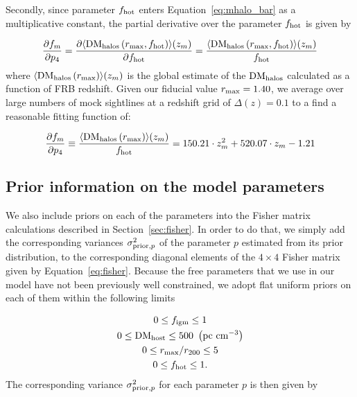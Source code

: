 \documentclass[twocolumn]{aastex63}
\newcommand{\fhot}{\ensuremath{f_\mathrm{hot}}}
\begin{document}
\begin{CJK*}{UTF8}{gbsn}
Secondly, since parameter $f_{\rm hot}$ enters Equation~\ref{eq:mhalo_bar} as a multiplicative constant, the partial derivative over the parameter $f_{\rm hot}$ is given by

\begin{equation}
    \frac{\partial f_m}{ \partial p_4} = \frac{ \partial \langle {\rm DM_{halos}}\left(r_{\rm max}, f_{\rm hot}\right)\rangle (z_m) }{\partial f_{\rm hot}} = \frac{ \langle {\rm DM_{halos}}\left(r_{\rm max}, \fhot \right)\rangle (z_m)}{\fhot}
\end{equation}
where $\langle {\rm DM_{halos}}\left(r_{\rm max} \right)\rangle (z_m)$ is the global estimate of the ${\rm DM}_{\rm halos}$ calculated as a function of FRB redshift. Given our fiducial value $r_{\rm max} = 1.40$, we average over large numbers of mock sightlines at a redshift grid of $\Delta(z) = 0.1$ to a find a reasonable fitting function of:

\begin{equation}
     \frac{\partial f_m}{ \partial p_4} \equiv \frac{\langle {\rm DM_{halos}}\left(r_{\rm max} \right)\rangle (z_m)}{f_{\rm hot}} = 150.21 \cdot z_m^2 + 520.07 \cdot z_m - 1.21  
\end{equation}


\subsection{Prior information on the model parameters}

We also include priors on each of the parameters into the Fisher matrix calculations described in Section~\ref{sec:fisher}. In order to do that, we simply add the corresponding variances $\sigma^2_{{\rm prior}, p}$ of the parameter $p$ estimated from its prior distribution, to the corresponding diagonal elements of the $4\times 4$ Fisher matrix given by Equation~\ref{eq:fisher}. Because the free parameters that we use in our model have not been previously well constrained, we adopt flat uniform priors on each of them within the following limits

\begin{gather*}
    0 \leq f_{\rm igm} \leq 1\\
    0 \leq {\rm DM_{host}} \leq 500\ \left( {\rm pc\ cm^{-3}}\right)\\
    0 \leq r_{\rm max}\slash r_{200} \leq 5\\
    0 \leq f_{\rm hot} \leq 1.
\end{gather*}
The corresponding variance $\sigma^2_{{\rm prior},p}$ for each parameter $p$ is then given by


\end{CJK*}
\end{document}
